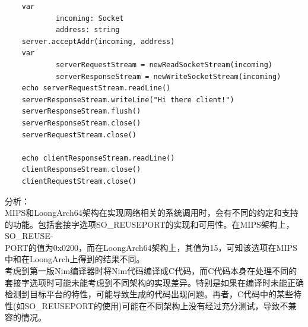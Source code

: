 \documentclass[UTF8]{ctexart}
\begin{document}
\begin{itemize}[leftmargin=3.5em]
\begin{tcolorbox}[colback=gray!20, colframe=gray!20, rounded corners, boxrule=-5pt, width=0.8\textwidth, left=0pt, right=0pt, top=0pt, bottom=0pt]
\begin{verbatim}
  	var
    		incoming: Socket
    		address: string
  	server.acceptAddr(incoming, address)
  	var
    		serverRequestStream = newReadSocketStream(incoming)
    		serverResponseStream = newWriteSocketStream(incoming)
  	echo serverRequestStream.readLine()
  	serverResponseStream.writeLine("Hi there client!")
  	serverResponseStream.flush()
  	serverResponseStream.close()
  	serverRequestStream.close()

  	echo clientResponseStream.readLine()
  	clientResponseStream.close()
	clientRequestStream.close()
				\end{verbatim}
			\end{tcolorbox}
			分析： \\
			\hspace*{2em}MIPS和LoongArch64架构在实现网络相关的系统调用时，会有不同的约定和支持的功能。包括套接字选项SO\_REUSEPORT的实现和可用性。在MIPS架构上，SO\_REUSE-\\PORT的值为0x0200，而在LoongArch64架构上，其值为15，可知该选项在MIPS中和在LoongArch上得到的结果不同。 \\
			\hspace*{2em}考虑到第一版Nim编译器时将Nim代码编译成C代码，而C代码本身在处理不同的套接字选项时可能未能考虑到不同架构的实现差异。特别是如果在编译时未能正确检测到目标平台的特性，可能导致生成的代码出现问题。再者，C代码中的某些特性(如SO\_REUSEPORT的使用)可能在不同架构上没有经过充分测试，导致不兼容的情况。
		\end{itemize}
\end{document}

